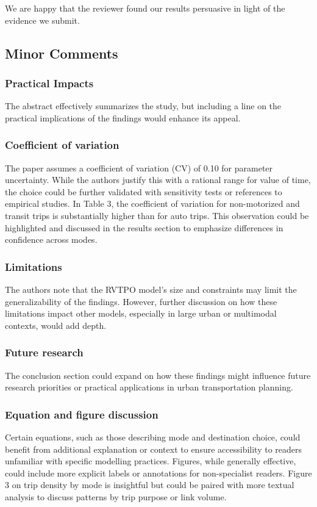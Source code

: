 \documentclass{ar2rc}
\begin{document}
\AR We are happy that the reviewer found our results persuasive in light of the evidence we submit.

\subsection{Minor Comments}

\subsubsection{Practical Impacts}
\RC The abstract effectively summarizes the study, but including a line on the practical
implications of the findings would enhance its appeal.

\subsubsection{Coefficient of variation}
\RC The paper assumes a coefficient of variation (CV) of 0.10 for parameter uncertainty.
While the authors justify this with a rational range for value of time, the choice could be
further validated with sensitivity tests or references to empirical studies. In Table 3, the
coefficient of variation for non-motorized and transit trips is substantially higher than
for auto trips. This observation could be highlighted and discussed in the results
section to emphasize differences in confidence across modes.

\subsubsection{Limitations}
\RC The authors note that the RVTPO model's size and constraints may limit the
generalizability of the findings. However, further discussion on how these limitations
impact other models, especially in large urban or multimodal contexts, would add
depth.

\subsubsection{Future research}
\RC The conclusion section could expand on how these findings might influence future
research priorities or practical applications in urban transportation planning.

\subsubsection{Equation and figure discussion}
\RC Certain equations, such as those describing mode and destination choice, could
benefit from additional explanation or context to ensure accessibility to readers
unfamiliar with specific modelling practices. Figures, while generally effective, could
include more explicit labels or annotations for non-specialist readers. Figure 3 on trip
density by mode is insightful but could be paired with more textual analysis to discuss
patterns by trip purpose or link volume.
\end{document}

